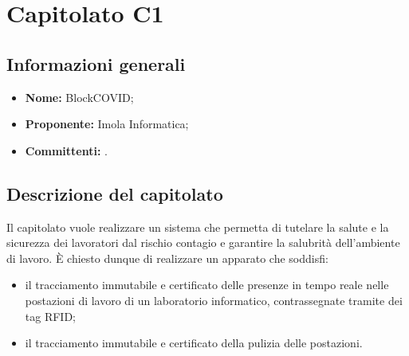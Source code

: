 \section{Capitolato C1}

\subsection{Informazioni generali}
\begin{itemize}
\item \textbf{Nome:} BlockCOVID;
\item \textbf{Proponente:} Imola Informatica;
\item \textbf{Committenti:} \committenti{}.
\end{itemize}

\subsection{Descrizione del capitolato}
Il capitolato vuole realizzare un sistema che permetta di tutelare la salute e la sicurezza dei lavoratori dal rischio contagio e garantire la salubrità dell'ambiente di lavoro. È chiesto dunque di realizzare un apparato che soddisfi:
\begin{itemize}
\item il tracciamento immutabile e certificato delle presenze in tempo reale nelle postazioni di lavoro di un laboratorio informatico, contrassegnate tramite dei tag RFID;
\item il tracciamento immutabile e certificato della pulizia delle postazioni.
\end{itemize}
